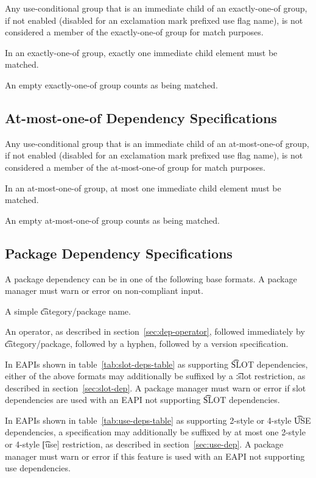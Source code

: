 Any use-conditional group that is an immediate child of an exactly-one-of group, if not enabled
(disabled for an exclamation mark prefixed use flag name), is not considered a member of the
exactly-one-of group for match purposes.

In an exactly-one-of group, exactly one immediate child element must be matched.

An empty exactly-one-of group counts as being matched.

\subsection{At-most-one-of Dependency Specifications}

Any use-conditional group that is an immediate child of an at-most-one-of group, if not enabled
(disabled for an exclamation mark prefixed use flag name), is not considered a member of the
at-most-one-of group for match purposes.

In an at-most-one-of group, at most one immediate child element must be matched.

An empty at-most-one-of group counts as being matched.

\subsection{Package Dependency Specifications}

A package dependency can be in one of the following base formats. A package manager must warn or
error on non-compliant input.

\begin{compactitem}
\item A simple \t{category/package} name.
\item An operator, as described in section~\ref{sec:dep-operator}, followed immediately by
    \t{category/package}, followed by a hyphen, followed by a version specification.
\end{compactitem}

In EAPIs shown in table~\ref{tab:slot-deps-table} as supporting \t{SLOT} dependencies, either of the
above formats may additionally be suffixed by a \t{:slot} restriction, as described in
section~\ref{sec:slot-dep}. A package manager must warn or error if slot dependencies are used with an
EAPI not supporting \t{SLOT} dependencies.

 In EAPIs shown in table~\ref{tab:use-deps-table} as supporting 2-style
or 4-style \t{USE} dependencies, a specification may additionally be suffixed by at most one
2-style or 4-style \t{[use]} restriction, as described in section~\ref{sec:use-dep}. A package
manager must warn or error if this feature is used with an EAPI not supporting use dependencies.

